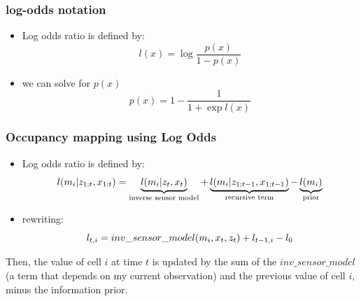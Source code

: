    \begin{frame}
    \frametitle{log-odds notation}
   
    \begin{itemize}
    \item Log odds ratio is defined by:
    \begin{equation*}
    l(x) = \log \dfrac{p(x)}{1-p(x)}
    \end{equation*}
    \item we can solve for $p(x)$
    \begin{equation*}
    p(x) = 1 - \dfrac{1}{1 + \exp l(x)}
    \end{equation*}
    \end{itemize}
   
   \end{frame}
   
   \begin{frame}
    \frametitle{Occupancy mapping using Log Odds}
   
    \begin{itemize}
    \item Log odds ratio is defined by:
    \begin{equation*}
    l(m _{i}| z _{1:t}, x _{1:t}) = \underbrace{l(m _{i}| z _{t}, x _{t})}_{\text{inverse sensor model}} + \underbrace{l(m _{i}| z _{1:t-1}, x _{1:t-1})}_{\text{recursive term}} - \underbrace{l(m_{i})}_{\text{prior}}
    \end{equation*}
    \item rewriting:
    \begin{equation*}
    l_{t,i} = inv\_sensor\_model(m_{i}, x_{t}, z_{t}) + l_{t-1,i} - l_{0}
   \end{equation*}
   \end{itemize}
   
   Then, the value of cell $i$ at time $t$ is updated by the sum of the $inv\_sensor\_model$ (a term that depends on my current observation) and the previous value of cell $i$, minus the information prior.
   
\end{frame}

